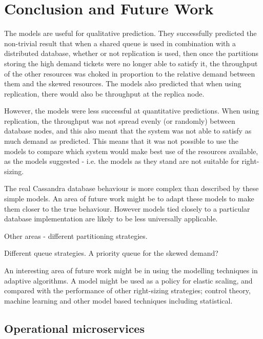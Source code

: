 %
%

\section{Conclusion and Future Work}

\begin{shaded}
	
The models are useful for qualitative prediction.  They successfully predicted the non-trivial result that when a shared queue is used in combination with a distributed database, whether or not replication is used, then once the partitions storing the high demand tickets were no longer able to satisfy it, the throughput of the other resources was choked in proportion to the relative demand between them and the skewed resources.  The models also predicted that when using replication, there would also be throughput at the replica node.

However, the models were less successful at quantitative predictions.  When using replication, the throughput was not spread evenly (or randomly) between database nodes, and this also meant that the system was not able to satisfy as much demand as predicted.  This means that it was not possible to use the models to compare which system would make best use of the resources available, as the models suggested - i.e. the models as they stand are not suitable for right-sizing.

The real Cassandra database behaviour is more complex than described by these simple models.  An area of future work might be to adapt these models to make them closer to the true behaviour.  However models tied closely to a particular database implementation are likely to be less universally applicable.

Other areas - different partitioning strategies.

Different queue strategies.  A priority queue for the skewed demand?

An interesting area of future work might be in using the modelling techniques in adaptive algorithms.  A model might be used as a policy for elastic scaling, and compared with the performance of other right-sizing strategies; control theory, machine learning and other model based techniques including statistical.

%
%
\subsection{Operational microservices}


\end{shaded}
